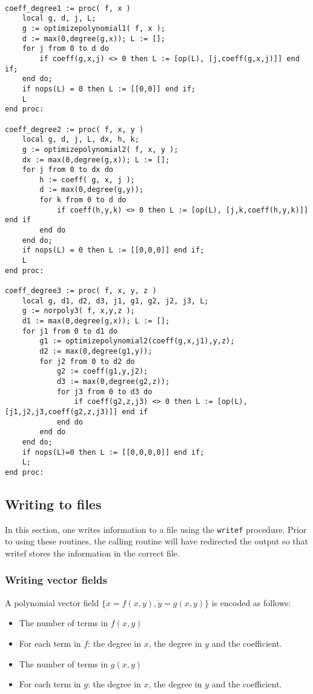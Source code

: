 \documentclass[a4paper,10pt]{article}
\begin{document}
\begin{lstlisting}[name=writelog]

coeff_degree1 := proc( f, x )
    local g, d, j, L;
    g := optimizepolynomial1( f, x );
    d := max(0,degree(g,x)); L := [];
    for j from 0 to d do
        if coeff(g,x,j) <> 0 then L := [op(L), [j,coeff(g,x,j)]] end if;
    end do;
    if nops(L) = 0 then L := [[0,0]] end if;
    L
end proc:

coeff_degree2 := proc( f, x, y )
    local g, d, j, L, dx, h, k;
    g := optimizepolynomial2( f, x, y );
    dx := max(0,degree(g,x)); L := [];
    for j from 0 to dx do
        h := coeff( g, x, j );
        d := max(0,degree(g,y));
        for k from 0 to d do
            if coeff(h,y,k) <> 0 then L := [op(L), [j,k,coeff(h,y,k)]] end if
        end do
    end do;
    if nops(L) = 0 then L := [[0,0,0]] end if;
    L
end proc:

coeff_degree3 := proc( f, x, y, z )
    local g, d1, d2, d3, j1, g1, g2, j2, j3, L;
    g := norpoly3( f, x,y,z );
    d1 := max(0,degree(g,x)); L := [];
    for j1 from 0 to d1 do
        g1 := optimizepolynomial2(coeff(g,x,j1),y,z);
        d2 := max(0,degree(g1,y));
        for j2 from 0 to d2 do
            g2 := coeff(g1,y,j2);
            d3 := max(0,degree(g2,z));
            for j3 from 0 to d3 do
                if coeff(g2,z,j3) <> 0 then L := [op(L), [j1,j2,j3,coeff(g2,z,j3)]] end if
            end do
        end do
    end do;
    if nops(L)=0 then L := [[0,0,0,0]] end if;
    L;
end proc:
\end{lstlisting}

\subsection{Writing to files}

In this section, one writes information to a file using the \verb+writef+ procedure.  Prior
to using these routines, the calling routine will have redirected the output so that writef
stores the information in the correct file.

\subsubsection{Writing vector fields}

A polynomial vector field $\{\dot{x} = f(x,y), \dot{y} = g(x,y)\}$ is encoded as follows:
\begin{itemize}
\item
    The number of terms in $f(x,y)$
\item
    For each term in $f$: the degree in $x$, the degree in $y$ and the coefficient.
\item
    The number of terms in $g(x,y)$
\item
    For each term in $g$: the degree in $x$, the degree in $y$ and the coefficient.
\end{itemize}
\end{document}
